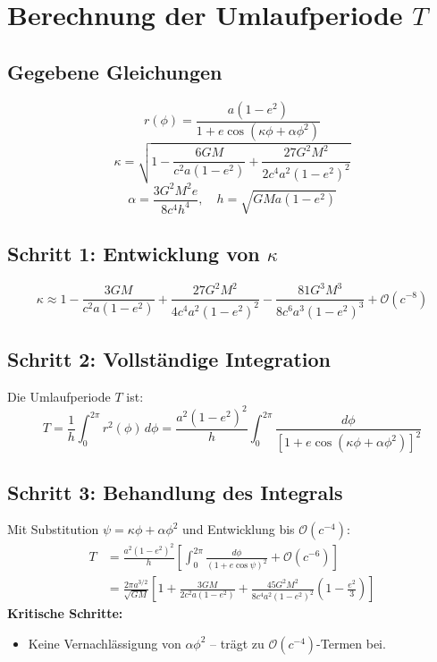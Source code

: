 \newpage
\section{Berechnung der Umlaufperiode \( T \)}

\subsection*{Gegebene Gleichungen}
\begin{equation}
r(\phi) = \frac{a(1-e^2)}{1 + e\cos\left(\kappa\phi + \alpha\phi^2\right)} \label{eq:orbit}
\end{equation}
\begin{equation}
\kappa = \sqrt{1 - \frac{6GM}{c^2a(1-e^2)} + \frac{27G^2M^2}{2c^4a^2(1-e^2)^2}} \label{eq:kappa}
\end{equation}
\begin{equation}
\alpha = \frac{3G^2M^2e}{8c^4h^4}, \quad h = \sqrt{GMa(1-e^2)} \label{eq:alpha}
\end{equation}

\subsection*{Schritt 1: Entwicklung von \(\kappa\)}
\begin{equation}
\kappa \approx 1 - \frac{3GM}{c^2a(1-e^2)} + \frac{27G^2M^2}{4c^4a^2(1-e^2)^2} - \frac{81G^3M^3}{8c^6a^3(1-e^2)^3} + \mathcal{O}(c^{-8}) 
\end{equation}

\subsection*{Schritt 2: Vollständige Integration}
Die Umlaufperiode \( T \) ist:
\begin{equation}
T = \frac{1}{h} \int_0^{2\pi} r^2(\phi) \, d\phi = \frac{a^2(1-e^2)^2}{h} \int_0^{2\pi} \frac{d\phi}{\left[1 + e\cos\left(\kappa\phi + \alpha\phi^2\right)\right]^2} \label{eq:T_integral}
\end{equation}

\subsection*{Schritt 3: Behandlung des Integrals}
Mit Substitution \(\psi = \kappa\phi + \alpha\phi^2\) und Entwicklung bis \(\mathcal{O}(c^{-4})\):
\begin{align}
T &= \frac{a^2(1-e^2)^2}{h} \left[ \int_0^{2\pi} \frac{d\phi}{(1 + e\cos\psi)^2} + \mathcal{O}(c^{-6}) \right] \\
  &= \frac{2\pi a^{3/2}}{\sqrt{GM}} \left[1 + \frac{3GM}{2c^2a(1-e^2)} + \frac{45G^2M^2}{8c^4a^2(1-e^2)^2}\left(1 - \frac{e^2}{3}\right)\right] \label{eq:T_final}
\end{align}
\textbf{Kritische Schritte:}
\begin{itemize}
\item Keine Vernachlässigung von \(\alpha\phi^2\) – trägt zu \(\mathcal{O}(c^{-4})\)-Termen bei.
\end{itemize}
